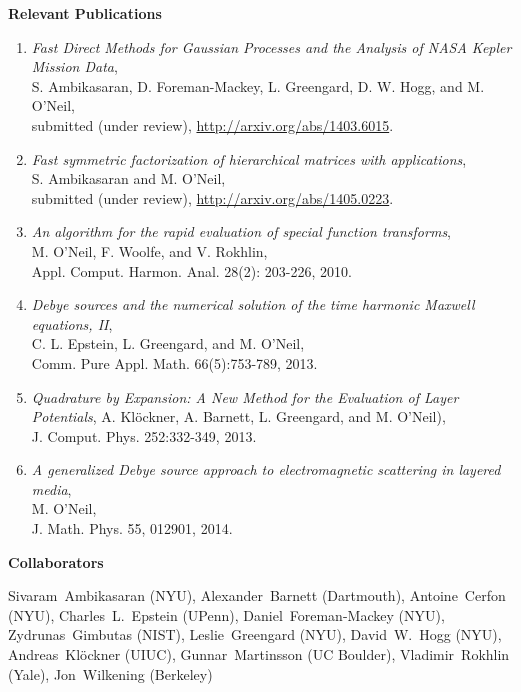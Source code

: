 \documentclass[12pt]{article}
\begin{document}
\noindent
{\bf Relevant Publications}
\begin{enumerate}
    \item {\em Fast Direct Methods for Gaussian Processes and the
        Analysis of NASA Kepler Mission Data},\\
            S. Ambikasaran, D. Foreman-Mackey,
                L. Greengard, D. W. Hogg, and M. O'Neil,\\
                submitted (under review),
            \url{http://arxiv.org/abs/1403.6015}.
    \item {\em Fast symmetric factorization of hierarchical matrices
            with applications},\\
            S. Ambikasaran and M. O'Neil,\\
            submitted (under review), \url{http://arxiv.org/abs/1405.0223}. 
    \item {\em An algorithm for the rapid evaluation of special 
            function transforms},\\
            M. O'Neil, F. Woolfe, and V. Rokhlin, \\
            Appl. Comput. Harmon. Anal. 28(2): 203-226, 2010.
    \item {\em Debye sources and the numerical solution of the time 
        harmonic Maxwell equations, II},\\
        C. L. Epstein,  L. Greengard, and M. O'Neil,\\ 
        Comm. Pure Appl. Math. 66(5):753-789, 2013.
    \item {\em Quadrature by Expansion: A New Method for the Evaluation 
        of Layer Potentials},
        A. Kl\"ockner, A. Barnett, L. Greengard, and M. O'Neil),\\
        J. Comput. Phys. 252:332-349, 2013.
    \item {\em A generalized Debye source approach to electromagnetic
        scattering in layered media},\\
        M. O'Neil,\\
        J. Math. Phys. 55, 012901, 2014.\\
\end{enumerate}




   
\noindent
{\bf Collaborators} \par \noindent
Sivaram~Ambikasaran (NYU),
Alexander~Barnett (Dartmouth),
Antoine~Cerfon (NYU),
Charles~L.~Epstein (UPenn),
Daniel~Foreman-Mackey (NYU),
Zydrunas~Gimbutas (NIST),
Leslie~Greengard (NYU),
David~W.~Hogg (NYU),
Andreas~Kl\"ockner (UIUC),
Gunnar~Martinsson (UC Boulder),
Vladimir~Rokhlin (Yale),
Jon~Wilkening (Berkeley)\\
\end{document}
